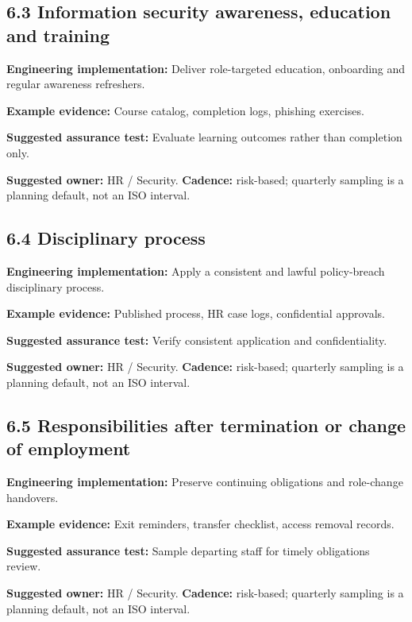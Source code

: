 \documentclass[11pt,letterpaper]{article}
\begin{document}
\subsection{6.3 Information security awareness, education and training}
\textbf{Engineering implementation:} Deliver role-targeted education, onboarding and regular awareness refreshers.\par
\textbf{Example evidence:} Course catalog, completion logs, phishing exercises.\par
\textbf{Suggested assurance test:} Evaluate learning outcomes rather than completion only.\par
\textbf{Suggested owner:} HR / Security. \textbf{Cadence:} risk-based; quarterly sampling is a planning default, not an ISO interval.\par
{}
\subsection{6.4 Disciplinary process}
\textbf{Engineering implementation:} Apply a consistent and lawful policy-breach disciplinary process.\par
\textbf{Example evidence:} Published process, HR case logs, confidential approvals.\par
\textbf{Suggested assurance test:} Verify consistent application and confidentiality.\par
\textbf{Suggested owner:} HR / Security. \textbf{Cadence:} risk-based; quarterly sampling is a planning default, not an ISO interval.\par
{}
\subsection{6.5 Responsibilities after termination or change of employment}
\textbf{Engineering implementation:} Preserve continuing obligations and role-change handovers.\par
\textbf{Example evidence:} Exit reminders, transfer checklist, access removal records.\par
\textbf{Suggested assurance test:} Sample departing staff for timely obligations review.\par
\textbf{Suggested owner:} HR / Security. \textbf{Cadence:} risk-based; quarterly sampling is a planning default, not an ISO interval.\par
{}
\end{document}
